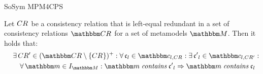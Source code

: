 \begin{copiedFrom}{SoSym MPM4CPS}
\begin{lemma} \label{lemma:leftequalredundancysubset}
    Let $CR_{}$ be a consistency relation that is left-equal redundant in a set of consistency relations $\consistencyrelationset{CR}$ for a set of metamodels $\metamodelset{M}$. Then it holds that: 
    \begin{align*}
        \formulaskip &
        \exists \consistencyrelation{CR'}{} \in \transitiveclosure{(\consistencyrelationset{CR} \setminus \setted{\consistencyrelation{CR}{}})} : 
        \forall \conditionelement{c}{l} \in \condition{c}{l, \consistencyrelation{CR}{}} : 
        \exists \conditionelement{c'}{l} \in \condition{c}{l,\consistencyrelation{CR'}{}} : \\
        & \formulaskip
        \forall \modelset{m} \in \metamodelinstances{\metamodelset{M}} : 
        \modelset{m} \containsmath \conditionelement{c'}{l} \Rightarrow 
        \modelset{m} \containsmath \conditionelement{c}{l}
    \end{align*}
\end{lemma}


\end{copiedFrom}
